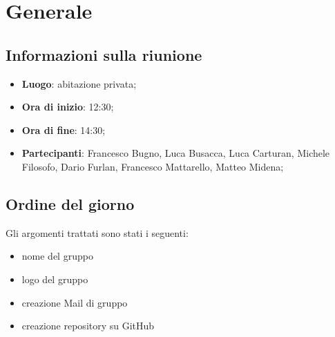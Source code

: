 \section{Generale}

\vspace{10pt}


\subsection{Informazioni sulla riunione}
\begin{itemize}
	\item \textbf{Luogo}: abitazione privata;
	\item \textbf{Ora di inizio}: 12:30;
	\item \textbf{Ora di fine}: 14:30;
	\item \textbf{Partecipanti}: Francesco Bugno, Luca Busacca, Luca Carturan, Michele Filosofo, Dario Furlan, Francesco Mattarello, Matteo Midena;
\end{itemize}

\vspace{5pt}

\subsection{Ordine del giorno}
Gli argomenti trattati sono stati i seguenti:
\begin{itemize}
	\item nome del gruppo
	\item logo del gruppo
	\item creazione Mail di gruppo
	\item creazione repository\glo{} su GitHub\glo
\end{itemize}
